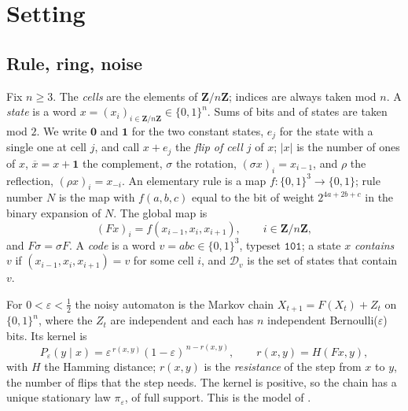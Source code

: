 \documentclass[10pt,a4paper]{article}
\newcommand{\Zn}{\mathbf{Z}/n\mathbf{Z}}      %
\newcommand{\st}{\{0,1\}^n}                   %
\newcommand{\zero}{\mathbf{0}}                %
\newcommand{\one}{\mathbf{1}}                 %
\newcommand{\eps}{\varepsilon}
\newcommand{\cpl}[1]{\overline{#1}}           %
\newcommand{\Dc}[1]{\mathcal{D}_{#1}}         %
\newcommand{\code}[1]{\mathtt{#1}}            %
\begin{document}
\section{Setting}\label{sec:setting}

\subsection{Rule, ring, noise}
Fix $n\ge 3$. The \emph{cells} are the elements of $\Zn$; indices are always taken mod $n$. A \emph{state} is a word
$x=(x_i)_{i\in\Zn}\in\st$. Sums of bits and of states are taken mod $2$. We write $\zero$ and $\one$ for the two
constant states, $e_j$ for the state with a single one at cell $j$, and call $x+e_j$ the \emph{flip of cell $j$} of $x$;
$|x|$ is the number of ones of $x$, $\cpl{x}=x+\one$ the complement, $\sigma$ the rotation, $(\sigma x)_i=x_{i-1}$, and
$\rho$ the reflection, $(\rho x)_i=x_{-i}$. An elementary rule is a map $f\colon\{0,1\}^3\to\{0,1\}$; rule number $N$ is
the map with $f(a,b,c)$ equal to the bit of weight $2^{4a+2b+c}$ in the binary expansion of $N$. The global map is
\[
(Fx)_i=f(x_{i-1},x_i,x_{i+1}),\qquad i\in\Zn ,
\]
and $F\sigma=\sigma F$. A \emph{code} is a word $v=abc\in\{0,1\}^3$, typeset $\code{101}$; a state $x$ \emph{contains}
$v$ if $(x_{i-1},x_i,x_{i+1})=v$ for some cell $i$, and $\Dc{v}$ is the set of states that contain $v$.

For $0<\eps<\tfrac12$ the noisy automaton is the Markov chain $X_{t+1}=F(X_t)+Z_t$ on $\st$, where the $Z_t$ are
independent and each has $n$ independent Bernoulli($\eps$) bits. Its kernel is
\[
P_\eps(y\mid x)=\eps^{\,r(x,y)}(1-\eps)^{\,n-r(x,y)},\qquad r(x,y)=H(Fx,y),
\]
with $H$ the Hamming distance; $r(x,y)$ is the \emph{resistance} of the step from $x$ to $y$, the number of flips that
the step needs. The kernel is positive, so the chain has a unique stationary law $\pi_\eps$, of full support. This is
the model of \cite{PeterleinNote}.
\end{document}
